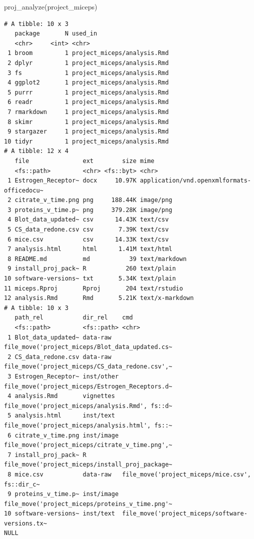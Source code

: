 \documentclass[12pt,twoside]{reedthesis}
\newenvironment{Shaded}{\begin{snugshade}}{\end{snugshade}}
\newcommand{\FunctionTok}[1]{\textcolor[rgb]{0.00,0.00,0.00}{#1}}
\newcommand{\NormalTok}[1]{#1}
\newcommand{\StringTok}[1]{\textcolor[rgb]{0.31,0.60,0.02}{#1}}
\begin{document}
\begin{Shaded}
\begin{Highlighting}[]
\FunctionTok{proj\_analyze}\NormalTok{(}\StringTok{\textquotesingle{}project\_miceps\textquotesingle{}}\NormalTok{)}
\end{Highlighting}
\end{Shaded}
\footnotesize
\begin{verbatim}
# A tibble: 10 x 3
   package       N used_in                    
   <chr>     <int> <chr>                      
 1 broom         1 project_miceps/analysis.Rmd
 2 dplyr         1 project_miceps/analysis.Rmd
 3 fs            1 project_miceps/analysis.Rmd
 4 ggplot2       1 project_miceps/analysis.Rmd
 5 purrr         1 project_miceps/analysis.Rmd
 6 readr         1 project_miceps/analysis.Rmd
 7 rmarkdown     1 project_miceps/analysis.Rmd
 8 skimr         1 project_miceps/analysis.Rmd
 9 stargazer     1 project_miceps/analysis.Rmd
10 tidyr         1 project_miceps/analysis.Rmd
# A tibble: 12 x 4
   file               ext        size mime                                      
   <fs::path>         <chr> <fs::byt> <chr>                                     
 1 Estrogen_Receptor~ docx     10.97K application/vnd.openxmlformats-officedocu~
 2 citrate_v_time.png png     188.44K image/png                                 
 3 proteins_v_time.p~ png     379.28K image/png                                 
 4 Blot_data_updated~ csv      14.43K text/csv                                  
 5 CS_data_redone.csv csv       7.39K text/csv                                  
 6 mice.csv           csv      14.33K text/csv                                  
 7 analysis.html      html      1.41M text/html                                 
 8 README.md          md           39 text/markdown                             
 9 install_proj_pack~ R           260 text/plain                                
10 software-versions~ txt       5.34K text/plain                                
11 miceps.Rproj       Rproj       204 text/rstudio                              
12 analysis.Rmd       Rmd       5.21K text/x-markdown                           
# A tibble: 10 x 3
   path_rel           dir_rel    cmd                                            
   <fs::path>         <fs::path> <chr>                                          
 1 Blot_data_updated~ data-raw   file_move('project_miceps/Blot_data_updated.cs~
 2 CS_data_redone.csv data-raw   file_move('project_miceps/CS_data_redone.csv',~
 3 Estrogen_Receptor~ inst/other file_move('project_miceps/Estrogen_Receptors.d~
 4 analysis.Rmd       vignettes  file_move('project_miceps/analysis.Rmd', fs::d~
 5 analysis.html      inst/text  file_move('project_miceps/analysis.html', fs::~
 6 citrate_v_time.png inst/image file_move('project_miceps/citrate_v_time.png',~
 7 install_proj_pack~ R          file_move('project_miceps/install_proj_package~
 8 mice.csv           data-raw   file_move('project_miceps/mice.csv', fs::dir_c~
 9 proteins_v_time.p~ inst/image file_move('project_miceps/proteins_v_time.png'~
10 software-versions~ inst/text  file_move('project_miceps/software-versions.tx~
NULL
\end{verbatim}
\normalsize
\end{document}
